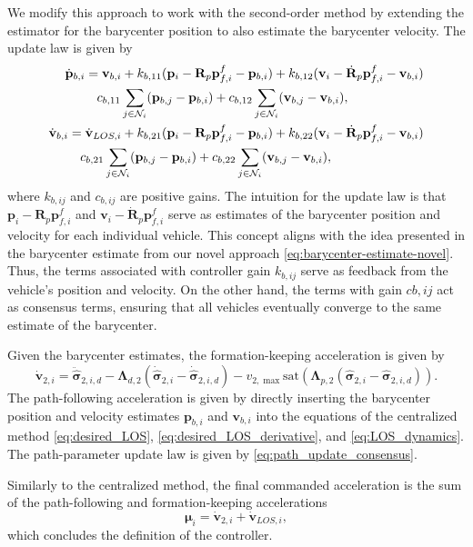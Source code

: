 We modify this approach to work with the second-order method by extending the estimator for the barycenter position to also estimate the barycenter velocity. The update law is given by
\begin{align}
\begin{split}
    \dot{\mathbf{p}}_{b,i} &= \mathbf{v}_{b,i} + k_{b,11}(\mathbf{p}_i-\mathbf{R}_p\mathbf{p}_{f,i}^f - \mathbf{p}_{b,i}) + k_{b,12}(\mathbf{v}_i-\dot{\mathbf{R}}_p\mathbf{p}_{f,i}^f - \mathbf{v}_{b,i})\\
    &\hphantom{=}\, c_{b,11}\sum_{j\in\mathcal{N}_i}(\mathbf{p}_{b,j}-\mathbf{p}_{b,i}) + c_{b,12}\sum_{j\in\mathcal{N}_i}  (\mathbf{v}_{b,j} - \mathbf{v}_{b,i}),
\end{split}\\
\begin{split}
    \dot{\mathbf{v}}_{b,i} &= \dot{\mathbf{v}}_{LOS,i} + k_{b,21}(\mathbf{p}_i-\mathbf{R}_p\mathbf{p}_{f,i}^f - \mathbf{p}_{b,i}) + k_{b,22}(\mathbf{v}_i-\dot{\mathbf{R}}_p\mathbf{p}_{f,i}^f - \mathbf{v}_{b,i})\\
    &\hphantom{=}\, c_{b,21}\sum_{j\in\mathcal{N}_i}(\mathbf{p}_{b,j}-\mathbf{p}_{b,i}) +c_{b,22}\sum_{j\in\mathcal{N}_i}  (\mathbf{v}_{b,j} - \mathbf{v}_{b,i}),
    \end{split}
\end{align}
where $k_{b,ij}$ and $c_{b,ij}$ are positive gains. The intuition for the update law is that $\mathbf{p}_i - \mathbf{R}_p \mathbf{p}_{f,i}^f$ and $\mathbf{v}_i-\dot{\mathbf{R}}_p\mathbf{p}_{f,i}^f$ serve as estimates of the barycenter position and velocity for each individual vehicle. This concept aligns with the idea presented in the barycenter estimate from our novel approach \eqref{eq:barycenter-estimate-novel}. Thus, the terms associated with controller gain $k_{b,ij}$ serve as feedback from the vehicle's position and velocity. On the other hand, the terms with gain $c{b,ij}$ act as consensus terms, ensuring that all vehicles eventually converge to the same estimate of the barycenter.

Given the barycenter estimates, the formation-keeping acceleration is given by
\begin{equation}
    \dot{\mathbf{v}}_{2,i} = \ddot{\widehat{\bm{\sigma}}}_{2,i,d} - \bm{\Lambda}_{d,2}(\dot{\widehat{\bm{\sigma}}}_{2,i} - \dot{\widehat{\bm{\sigma}}}_{2,i,d}) -v_{2,\max} \mathrm{sat}(\bm{\Lambda}_{p,2}(\widehat{\bm{\sigma}}_{2,i} - \widehat{\bm{\sigma}}_{2,i,d})).
\end{equation}
The path-following acceleration is given by directly inserting the barycenter position and velocity estimates $\mathbf{p}_{b,i}$ and $\mathbf{v}_{b,i}$ into the equations of the centralized method \eqref{eq:desired_LOS}, \eqref{eq:desired_LOS_derivative}, and \eqref{eq:LOS_dynamics}. The path-parameter update law is given by \eqref{eq:path_update_consensus}.

Similarly to the centralized method, the final commanded acceleration is the sum of the path-following and formation-keeping accelerations
\begin{equation}
    \bm{\mu}_i = \dot{\mathbf{v}}_{2,i} + \dot{\mathbf{v}}_{LOS,i},
\end{equation}
which concludes the definition of the controller.